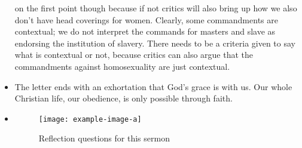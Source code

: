 \begin{itemize}
{{  on the first point though because if not critics will also bring up how we
  also don't have head coverings for women. Clearly, some commandments are
  contextual; we do not interpret the commands for masters and slave as
  endorsing the institution of slavery. There needs to be a criteria given to
  say what is contextual or not, because critics can also argue that the
  commandments against homosexuality are just contextual. }}
  \item{The letter ends with an exhortation that God's grace is with us. Our whole Christian life, our obedience, is only possible through faith. }
  \item{\begin{figure}[H]
    \centering
    \texttt{[image: example-image-a]}
    \caption[]{Reflection questions for this sermon}
    \label{}
  \end{figure}}
\end{itemize}